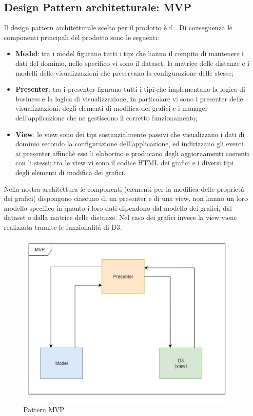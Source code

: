 \documentclass[../manuale_sviluppatore.tex]{subfiles}
\begin{document}
\subsection{Design Pattern architetturale: MVP}
Il design pattern architetturale scelto per il prodotto è il . 
Di conseguenza le componenti principali del prodotto sono le seguenti:
\begin{itemize}
	\item \textbf{Model}: tra i model figurano tutti i tipi che hanno il compito di mantenere i dati 
	del dominio, nello specifico vi sono il dataset, la matrice delle distanze e i modelli delle visualizzazioni 
	che preservano la configurazione delle stesse;
	\item \textbf{Presenter}: tra i presenter figurano tutti i tipi che implementano la logica di 
	business e la logica di visualizzazione, in particolare vi sono i presenter delle visualizzazioni, 
	degli elementi di modifica dei grafici e i manager dell'applicazione che ne gestiscono il corretto funzionamento;
	\item \textbf{View}: le view sono dei tipi sostanzialmente passivi che visualizzano i dati di dominio 
	secondo la configurazione dell'applicazione, ed indirizzano gli eventi ai presenter affinchè essi 
	li elaborino e producano degli aggiornamenti coerenti con li stessi; tra le view vi sono il 
	codice HTML dei grafici e i diversi tipi degli elementi di modifica dei grafici.

\end{itemize}
Nella nostra architettura le componenti (elementi per la modifica delle proprietà dei grafici) 
dispongono ciascuno di un presenter e di una view, non hanno un loro modello specifico in quanto i 
loro dati dipendono dal modello dei grafici, dal dataset o dalla matrice delle distanze. Nel caso dei
grafici invece la view viene realizzata tramite le funzionalità di D3.

\begin{figure}[H]
	\centering
	\includegraphics[width=18cm]{img/patternMVP.jpg}
	\caption{Pattern MVP}
\end{figure}
\end{document}
